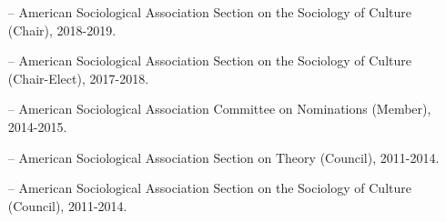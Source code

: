 
\begin{itemize}[itemsep=-0.5ex]
    \item[--] American Sociological Association Section on the Sociology of Culture (Chair), 2018-2019.
    
    \item[--] American Sociological Association Section on the Sociology of Culture (Chair-Elect), 2017-2018.
    
    \item[--] American Sociological Association Committee on Nominations (Member), 2014-2015. 
    
    \item[--] American Sociological Association Section on Theory (Council), 2011-2014.
    
    \item[--] American Sociological Association Section on the Sociology of Culture (Council), 2011-2014.
\end{itemize}